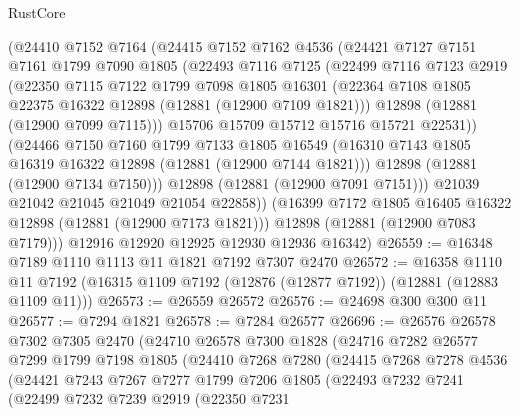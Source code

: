 \begin{lexlean}{RustCore}
\begin{coremodule}
        (@24410
          @7152
          @7164
          (@24415
            @7152
            @7162
            @4536
            (@24421
              @7127
              @7151
              @7161
              @1799
              @7090
              @1805
              (@22493
                @7116
                @7125
                (@22499
                  @7116
                  @7123
                  @2919
                  (@22350
                    @7115
                    @7122
                    @1799
                    @7098
                    @1805
                    @16301
                    (@22364 @7108 @1805 @22375 @16322 @12898 (@12881 (@12900 @7109 @1821)))
                    @12898
                    (@12881 (@12900 @7099 @7115)))
                  @15706
                  @15709
                  @15712
                  @15716
                  @15721
                  @22531))
              (@24466
                @7150
                @7160
                @1799
                @7133
                @1805
                @16549
                (@16310 @7143 @1805 @16319 @16322 @12898 (@12881 (@12900 @7144 @1821)))
                @12898
                (@12881 (@12900 @7134 @7150)))
              @12898
              (@12881 (@12900 @7091 @7151)))
            @21039
            @21042
            @21045
            @21049
            @21054
            @22858))
        (@16399 @7172 @1805 @16405 @16322 @12898 (@12881 (@12900 @7173 @1821)))
        @12898
        (@12881 (@12900 @7083 @7179)))
      @12916
      @12920
      @12925
      @12930
      @12936
      @16342)
@26559 := @16348 @7189 @1110 @1113 @11 @1821 @7192 @7307 @2470
@26572 := @16358
    @1110
    @11
    @7192
    (@16315 @1109 @7192 (@12876 (@12877 @7192)) (@12881 (@12883 @1109 @11)))
@26573 := @26559 @26572
@26576 := @24698 @300 @300 @11
@26577 := @7294 @1821
@26578 := @7284 @26577
@26696 := @26576
    @26578
    @7302
    @7305
    @2470
    (@24710
      @26578
      @7300
      @1828
      (@24716
        @7282
        @26577
        @7299
        @1799
        @7198
        @1805
        (@24410
          @7268
          @7280
          (@24415
            @7268
            @7278
            @4536
            (@24421
              @7243
              @7267
              @7277
              @1799
              @7206
              @1805
              (@22493
                @7232
                @7241
                (@22499
                  @7232
                  @7239
                  @2919
                  (@22350
                    @7231

\end{coremodule}
\end{lexlean}
